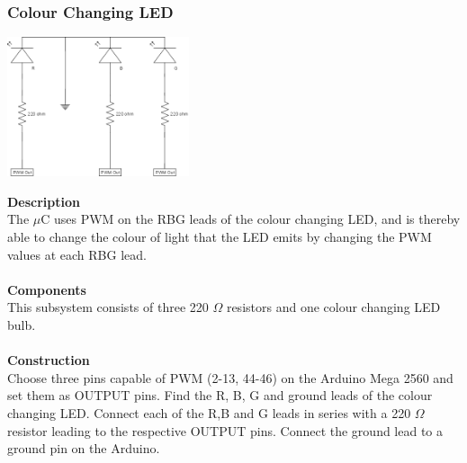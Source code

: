 \documentclass[titlepage]{article}
\begin{document}
\subsubsection{Colour Changing LED}
\begin{center}
	\includegraphics[width = 0.4\textwidth]{ColourChangingLED.png}
\label{fig:ColourChangingLEDFig}
\end{center}
\textbf{Description}\\
The $\mu$C uses PWM on the RBG leads of the colour changing LED, and is thereby able to change the colour of light that the LED emits by changing the PWM values at each RBG lead.\\\\
\textbf{Components}\\
This subsystem consists of three 220 $\Omega$ resistors and one colour changing LED bulb.\\\\
\textbf{Construction}\\
Choose three pins capable of PWM (2-13, 44-46)  on the Arduino Mega 2560 and set them as OUTPUT pins. Find the R, B, G and ground leads of the colour changing LED. Connect each of the R,B and G leads in series with a 220 $\Omega$ resistor leading to the respective OUTPUT pins. Connect the ground lead to a ground pin on the Arduino.

\newpage
\end{document}
